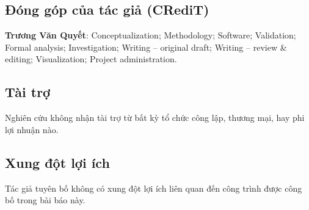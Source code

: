 \subsection*{Đóng góp của tác giả (CRediT)}

\textbf{Trương Văn Quyết}: Conceptualization; Methodology; Software;
Validation; Formal analysis; Investigation; Writing -- original draft;
Writing -- review \& editing; Visualization; Project administration.

\subsection*{Tài trợ}

Nghiên cứu không nhận tài trợ từ bất kỳ tổ chức công lập, thương mại,
hay phi lợi nhuận nào.

\subsection*{Xung đột lợi ích}

Tác giả tuyên bố không có xung đột lợi ích liên quan đến công trình
được công bố trong bài báo này.

